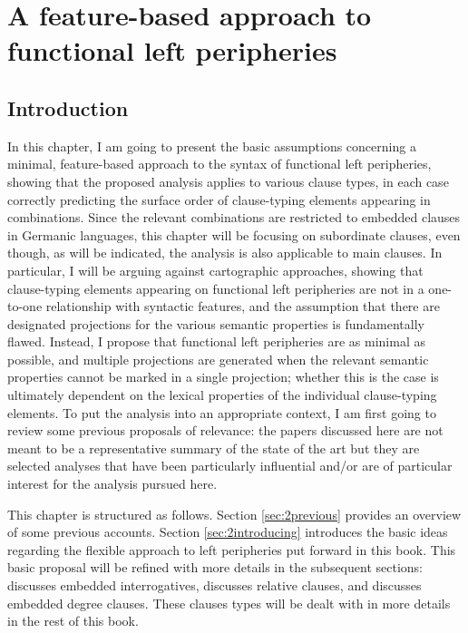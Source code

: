 \chapter{A feature-based approach to functional left peripheries} \label{ch:2}
\section{Introduction} \label{sec:2introduction}
In this chapter, I am going to present the basic assumptions concerning a minimal, feature-based approach to the syntax of functional left peripheries, showing that the proposed analysis applies to various clause types, in each case correctly predicting the surface order of clause-typing elements appearing in combinations. Since the relevant combinations are restricted to embedded clauses in Germanic languages, this chapter will be focusing on subordinate clauses, even though, as will be indicated, the analysis is also applicable to main clauses. In particular, I will be arguing against cartographic approaches, showing that clause-typing elements appearing on functional left peripheries are not in a one-to-one relationship with syntactic features, and the assumption that there are designated projections for the various semantic properties is fundamentally flawed. Instead, I propose that functional left peripheries are as minimal as possible, and multiple projections are generated when the relevant semantic properties cannot be marked in a single projection; whether this is the case is ultimately dependent on the lexical properties of the individual clause-typing elements. To put the analysis into an appropriate context, I am first going to review some previous proposals of relevance: the papers discussed here are not meant to be a representative summary of the state of the art but they are selected analyses that have been particularly influential and/or are of particular interest for the analysis pursued here.

This chapter is structured as follows. Section \ref{sec:2previous} provides an overview of some previous accounts. Section \ref{sec:2introducing} introduces the basic ideas regarding the flexible approach to left peripheries put forward in this book. This basic proposal will be refined with more details in the subsequent sections:  discusses embedded interrogatives,  discusses relative clauses, and  discusses embedded degree clauses. These clauses types will be dealt with in more details in the rest of this book.

